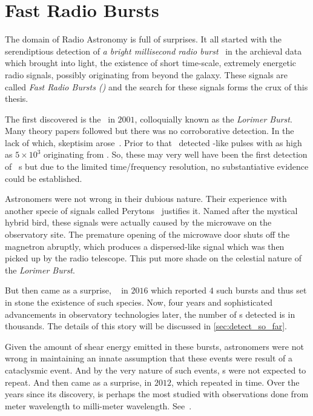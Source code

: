 \chapter{Fast Radio Bursts}\label{ch:frb}

\par The domain of Radio Astronomy is full of surprises. 
It all started with the serendiptious detection of \emph{a bright millisecond radio burst}~\cite{lorimerburst} in the archieval data which brought into light, the existence of short time-scale, extremely energetic radio signals, possibly originating from beyond the galaxy. 
These signals are called \emph{Fast Radio Bursts (\frb{})} and the search for these signals forms the crux of this thesis.

\par The first discovered \frb is the~\cite{lorimerburst} in $2001$, colloquially known as the \emph{Lorimer Burst}. 
Many theory papers followed but there was no corroborative detection. In the lack of which, skeptisim arose~\cite{burke_doubt}. 
Prior to that~\cite{old_m87_bursts} detected \frb-like pulses with \dm as high as $5\times 10^3$ \pc originating from . So, these may very well have been the first detection of \frb~s but due to the limited time/frequency resolution, no substantiative evidence could be established. 

\par Astronomers were not wrong in their dubious nature. Their experience with another specie of signals called Perytons~\cite{perytons} justifies it. Named after the mystical hybrid bird, these signals were actually caused by the microwave on the observatory site. The premature opening of the microwave door shuts off the magnetron abruptly, which produces a dispersed-like signal which was then picked up by the radio telescope.
This put more shade on the celestial nature of the \emph{Lorimer Burst}.

\par But then came as a surprise, ~\cite{danburst4} in $2016$ which reported $4$ such bursts and thus set in stone the existence of such species. 
Now, four years and sophisticated advancements in observatory technologies later, the number of \frb{}s detected is in thousands. The details of this story will be discussed in \autoref{sec:detect_so_far}.

\par Given the amount of shear energy emitted in these bursts, astronomers were not wrong in maintaining an innate assumption that these events were result of a cataclysmic event. And by the very nature of such events, \frb{}s were not expected to repeat. And then came as a surprise,  in $2012$, which repeated in time.
Over the years since its discovery,  is perhaps the most studied \frb{} with observations done from meter wavelength to milli-meter wavelength. See~\cite{sptlier}.

